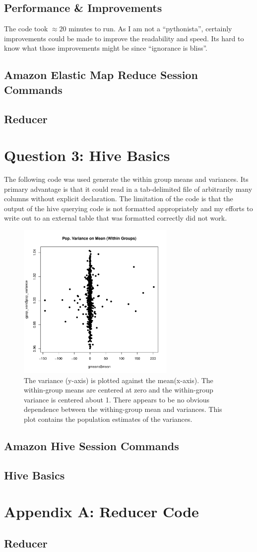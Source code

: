 \documentclass[10pt]{amsart}
\newcommand{\prettycode}[2]{
  \hrulefill
  \subsection*{#1}
  
  \vspace{2em}
}
\begin{document}
\subsection{Performance \& Improvements}

The code took $\approx 20$ minutes to run. As I am not a ``pythonista'', certainly improvements could be made to improve the readability and speed. Its hard to know what those improvements might be since ``ignorance is bliss''. 


\subsection{Amazon Elastic Map Reduce Session Commands}
\prettycode{Reducer}{../Streaming/my_aws_hadoop_hw_session.sh}

\section{Question 3: Hive Basics}

The following code was used generate the within group means and variances. Its primary advantage is that it could read in a tab-delimited file of arbitrarily many columns without explicit declaration. The limitation of the code is that the output of the hive querying code is not formatted appropriately and my efforts to write out to an external table that was formatted correctly did not work. 


\begin{figure}[htbp] %
   \centering
   \includegraphics[width=3in]{../HiveBasics/mean_on_var.pdf} 
   \caption{The variance (y-axis) is plotted against  the mean(x-axis). The within-group means are centered at zero and the within-group variance is centered about 1. There appears  to be no obvious dependence between the withing-group mean and variances. This plot contains the population estimates of the variances. }
   \label{fig:hivebasics}
\end{figure}

\newpage

\subsection{Amazon Hive Session Commands}

\prettycode{Hive Basics}{../HiveBasics/within_stats.sh}


\section{Appendix A: Reducer Code}



\prettycode{Reducer}{../Streaming/reducer.py}
\end{document}
